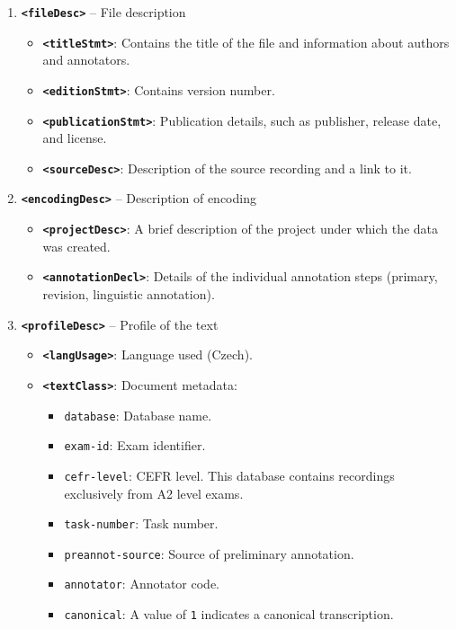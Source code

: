 \documentclass[
]{article}
\providecommand{\tightlist}{%
  \setlength{\itemsep}{0pt}\setlength{\parskip}{0pt}}
\begin{document}
\begin{enumerate}
\def\labelenumi{\arabic{enumi}.}
\tightlist
\item
  \textbf{\texttt{\textless{}fileDesc\textgreater{}}} -- File
  description

  \begin{itemize}
  \tightlist
  \item
    \textbf{\texttt{\textless{}titleStmt\textgreater{}}}: Contains the
    title of the file and information about authors and annotators.
  \item
    \textbf{\texttt{\textless{}editionStmt\textgreater{}}}: Contains
    version number.
  \item
    \textbf{\texttt{\textless{}publicationStmt\textgreater{}}}:
    Publication details, such as publisher, release date, and license.
  \item
    \textbf{\texttt{\textless{}sourceDesc\textgreater{}}}: Description
    of the source recording and a link to it.
  \end{itemize}
\item
  \textbf{\texttt{\textless{}encodingDesc\textgreater{}}} -- Description
  of encoding

  \begin{itemize}
  \tightlist
  \item
    \textbf{\texttt{\textless{}projectDesc\textgreater{}}}: A brief
    description of the project under which the data was created.
  \item
    \textbf{\texttt{\textless{}annotationDecl\textgreater{}}}: Details
    of the individual annotation steps (primary, revision, linguistic
    annotation).
  \end{itemize}
\item
  \textbf{\texttt{\textless{}profileDesc\textgreater{}}} -- Profile of
  the text

  \begin{itemize}
  \tightlist
  \item
    \textbf{\texttt{\textless{}langUsage\textgreater{}}}: Language used
    (Czech).
  \item
    \textbf{\texttt{\textless{}textClass\textgreater{}}}: Document
    metadata:

    \begin{itemize}
    \tightlist
    \item
      \texttt{database}: Database name.
    \item
      \texttt{exam-id}: Exam identifier.
    \item
      \texttt{cefr-level}: CEFR level. This database contains recordings
      exclusively from A2 level exams.
    \item
      \texttt{task-number}: Task number.
    \item
      \texttt{preannot-source}: Source of preliminary annotation.
    \item
      \texttt{annotator}: Annotator code.
    \item
      \texttt{canonical}: A value of \texttt{1} indicates a canonical
      transcription.
    \end{itemize}
  \end{itemize}
\end{enumerate}
\end{document}
